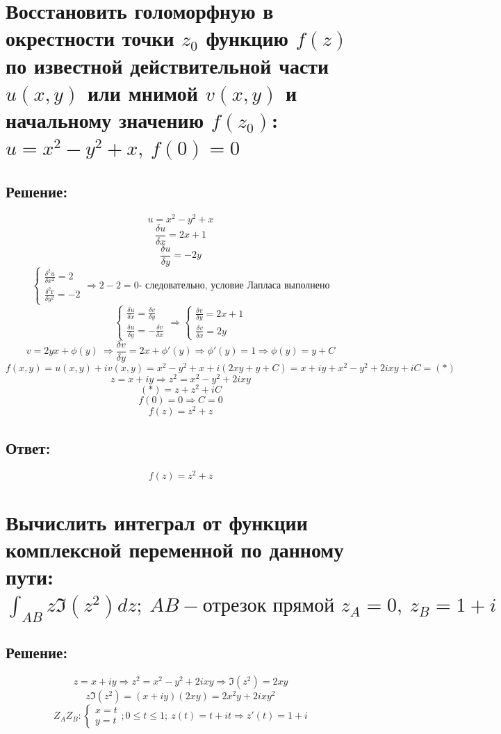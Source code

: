 \documentclass{article}
\begin{document}
	
	
	\section{Восстановить голоморфную в окрестности точки $z_0$ функцию $f(z)$ по известной действительной части $u(x,y)$ или мнимой $v(x,y)$ и начальному значению $f(z_0)$: $u = x^2 - y^2 + x, \ f(0) = 0$}
	\subsection{Решение:}
	\[u = x^2 - y^2 + x\]
	\[\frac{\delta u}{\delta x} = 2x+1\]
	\[\frac{\delta u}{\delta y} = -2y\]
	\[\begin{cases}
		\frac{\delta^2 u}{\delta x ^2} = 2\\
		\frac{\delta ^ 2 г}{\delta y^2} = -2
	\end{cases} \Rightarrow 2 -2 = 0 \text{- следовательно, условие Лапласа выполнено}\]
	\[\begin{cases}
		\frac{\delta u }{\delta x} = \frac{\delta v}{\delta y} \\
		\frac{\delta u} {\delta y} = - \frac{\delta v}{\delta x}
	\end{cases} \Rightarrow
	\begin{cases}
		\frac{\delta v}{\delta y} = 2x+1 \\
		\frac{\delta v}{\delta x} = 2y
	\end{cases}\]
	\[v = 2yx + \phi (y) \ \Rightarrow \frac{\delta v}{\delta y} =2x + \phi'(y) \Rightarrow \phi' (y) = 1 \Rightarrow \phi(y) = y+C\]
	\[f(x,y) = u(x,y) + iv(x,y) = x^2 - y^2 +x + i (2xy + y + C)  = x + iy + x^2 - y^2 + 2ixy + iC =(*)\]
	\[z = x + iy \Rightarrow z ^2 = x^2 - y^2 +2ixy\]
	\[(*) = z + z^2 + iC\]
	\[f(0) = 0 \Rightarrow C = 0\]
	\[f(z) = z^2 + z\]
	\subsection{Ответ:}
	\[f(z) = z^2 + z\]
	
	\section{Вычислить интеграл от функции комплексной переменной по данному пути: $\int_{AB} z \Im(z^2) dz; \ AB - \text{отрезок прямой } z_A = 0, \ z_B = 1 + i$}
	\subsection{Решение:}
	\[z= x +iy \Rightarrow z ^2 = x^2 - y^2 + 2ixy \Rightarrow \Im(z^2) = 2xy\]
	\[z\Im (z^2) = (x+iy)(2xy) = 2x^2y + 2ixy^2\]
	\[Z_AZ_B: \begin{cases}
		x =t \\ y = t
	\end{cases}; 0 \le t \le 1; \ z(t) = t + it \Rightarrow z'(t) = 1 + i\]
	
\end{document}

